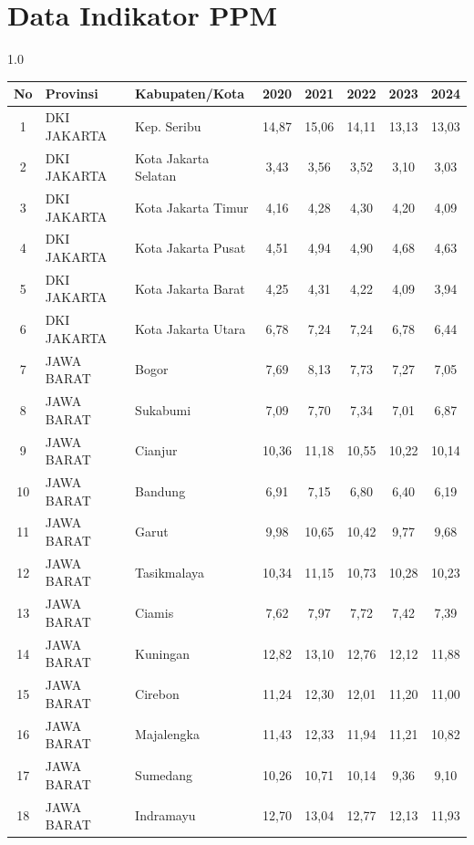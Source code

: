 \section*{Data Indikator PPM}
\begin{spacing}{1.0}
\scriptsize
\setlength{\tabcolsep}{2pt}
\begin{longtable}{|c|p{2.2cm}|p{2.8cm}|c|c|c|c|c|}
\hline
\textbf{No} & \textbf{Provinsi} & \textbf{Kabupaten/Kota} & \textbf{2020} & \textbf{2021} & \textbf{2022} & \textbf{2023} & \textbf{2024} \\ \hline
\endhead
1 & DKI JAKARTA & Kep. Seribu & 14,87 & 15,06 & 14,11 & 13,13 & 13,03 \\ \hline
2 & DKI JAKARTA & Kota Jakarta Selatan & 3,43 & 3,56 & 3,52 & 3,10 & 3,03 \\ \hline
3 & DKI JAKARTA & Kota Jakarta Timur & 4,16 & 4,28 & 4,30 & 4,20 & 4,09 \\ \hline
4 & DKI JAKARTA & Kota Jakarta Pusat & 4,51 & 4,94 & 4,90 & 4,68 & 4,63 \\ \hline
5 & DKI JAKARTA & Kota Jakarta Barat & 4,25 & 4,31 & 4,22 & 4,09 & 3,94 \\ \hline
6 & DKI JAKARTA & Kota Jakarta Utara & 6,78 & 7,24 & 7,24 & 6,78 & 6,44 \\ \hline
7 & JAWA BARAT & Bogor & 7,69 & 8,13 & 7,73 & 7,27 & 7,05 \\ \hline
8 & JAWA BARAT & Sukabumi & 7,09 & 7,70 & 7,34 & 7,01 & 6,87 \\ \hline
9 & JAWA BARAT & Cianjur & 10,36 & 11,18 & 10,55 & 10,22 & 10,14 \\ \hline
10 & JAWA BARAT & Bandung & 6,91 & 7,15 & 6,80 & 6,40 & 6,19 \\ \hline
11 & JAWA BARAT & Garut & 9,98 & 10,65 & 10,42 & 9,77 & 9,68 \\ \hline
12 & JAWA BARAT & Tasikmalaya & 10,34 & 11,15 & 10,73 & 10,28 & 10,23 \\ \hline
13 & JAWA BARAT & Ciamis & 7,62 & 7,97 & 7,72 & 7,42 & 7,39 \\ \hline
14 & JAWA BARAT & Kuningan & 12,82 & 13,10 & 12,76 & 12,12 & 11,88 \\ \hline
15 & JAWA BARAT & Cirebon & 11,24 & 12,30 & 12,01 & 11,20 & 11,00 \\ \hline
16 & JAWA BARAT & Majalengka & 11,43 & 12,33 & 11,94 & 11,21 & 10,82 \\ \hline
17 & JAWA BARAT & Sumedang & 10,26 & 10,71 & 10,14 & 9,36 & 9,10 \\ \hline
18 & JAWA BARAT & Indramayu & 12,70 & 13,04 & 12,77 & 12,13 & 11,93 \\ \hline

\end{longtable}
\end{spacing}
